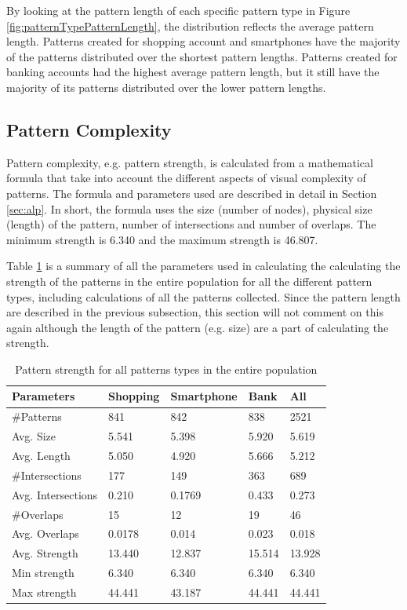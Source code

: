     By looking at the pattern length of each specific pattern type in Figure \ref{fig:patternTypePatternLength}, the distribution reflects the average pattern length. Patterns created for shopping account and smartphones have the majority of the patterns distributed over the shortest pattern lengths. Patterns created for banking accounts had the highest average pattern length, but it still have the majority of its patterns distributed over the lower pattern lengths.

	\subsection{Pattern Complexity}

    Pattern complexity, e.g. pattern strength, is calculated from a mathematical formula that take into account the different aspects of visual complexity of patterns. The formula and parameters used are described in detail in Section \ref{sec:alp}. In short, the formula uses the size (number of nodes), physical size (length) of the pattern, number of intersections and number of overlaps. The minimum strength is 6.340 and the maximum strength is 46.807.

    Table \ref{tab:patternstrength} is a summary of all the parameters used in calculating the calculating the strength of the patterns in the entire population for all the different pattern types, including calculations of all the patterns collected. Since the pattern length are described in the previous subsection, this section will not comment on this again although the length of the pattern (e.g. size) are a part of calculating the strength. 

    \begin{table}[H]
    \centering
      \begin{tabular}{l || l | l | l || l}
        \hline
        {\bf Parameters} & {\bf Shopping} & {\bf Smartphone} & {\bf Bank} & {\bf All} \\ \hline
        \#Patterns & 841 & 842 & 838                  & 2521 \\
        Avg. Size & 5.541 & 5.398 & 5.920             & 5.619 \\ 
        Avg. Length & 5.050 & 4.920 & 5.666           & 5.212 \\
        \#Intersections & 177 & 149 & 363             & 689 \\
        Avg. Intersections & 0.210 & 0.1769 & 0.433   & 0.273 \\
        \#Overlaps & 15 & 12 & 19                     & 46 \\
        Avg. Overlaps & 0.0178 & 0.014 & 0.023        & 0.018 \\ \hline
        Avg. Strength & 13.440 & 12.837 & 15.514      & 13.928 \\ 
        Min strength & 6.340 & 6.340 & 6.340          & 6.340 \\
        Max strength & 44.441 & 43.187 & 44.441       & 44.441 \\ \hline
      \end{tabular}
      \caption{Pattern strength for all patterns types in the entire population}
      \label{tab:patternstrength}
    \end{table}

